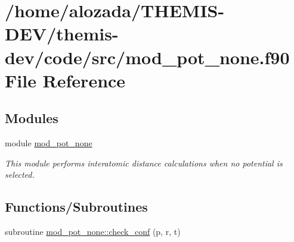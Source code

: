 \hypertarget{mod__pot__none_8f90}{}\section{/home/alozada/\+T\+H\+E\+M\+I\+S-\/\+D\+E\+V/themis-\/dev/code/src/mod\+\_\+pot\+\_\+none.f90 File Reference}
\label{mod__pot__none_8f90}
\subsection*{Modules}
\begin{DoxyCompactItemize}
\item 
module \hyperlink{namespacemod__pot__none}{mod\+\_\+pot\+\_\+none}
\begin{DoxyCompactList}\small\item\em This module performs interatomic distance calculations when no potential is selected. \end{DoxyCompactList}\end{DoxyCompactItemize}
\subsection*{Functions/\+Subroutines}
\begin{DoxyCompactItemize}
\item 
subroutine \hyperlink{namespacemod__pot__none_a696314c32ed889a4ff2b669fcacaf471}{mod\+\_\+pot\+\_\+none\+::check\+\_\+conf} (p, r, t)
\end{DoxyCompactItemize}
